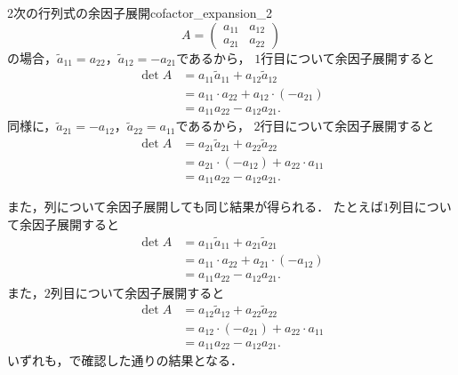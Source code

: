 \begin{example}{2次の行列式の余因子展開}{cofactor_expansion_2}
  \[
  A = \begin{pmatrix}
    a_{11} & a_{12} \\
    a_{21} & a_{22}
  \end{pmatrix}
  \]
  の場合，$\tilde{a}_{11} = a_{22}$，$\tilde{a}_{12} = -a_{21}$であるから，
  $1$行目について余因子展開すると
  \begin{align*}
    \det A
    &= a_{11}\tilde{a}_{11} + a_{12}\tilde{a}_{12} \\
    &= a_{11}\cdot a_{22} + a_{12}\cdot(-a_{21}) \\
    &= a_{11}a_{22} - a_{12}a_{21}.
  \end{align*}
  同様に，$\tilde{a}_{21} = -a_{12}$，$\tilde{a}_{22} = a_{11}$であるから，
  $2$行目について余因子展開すると
  \begin{align*}
    \det A
    &= a_{21}\tilde{a}_{21} + a_{22}\tilde{a}_{22} \\
    &= a_{21}\cdot(-a_{12}) + a_{22}\cdot a_{11} \\
    &= a_{11}a_{22} - a_{12}a_{21}.
  \end{align*}

  また，列について余因子展開しても同じ結果が得られる．
  たとえば$1$列目について余因子展開すると
  \begin{align*}
    \det A
    &= a_{11}\tilde{a}_{11} + a_{21}\tilde{a}_{21} \\
    &= a_{11}\cdot a_{22} + a_{21}\cdot(-a_{12}) \\
    &= a_{11}a_{22} - a_{12}a_{21}.
  \end{align*}
  また，$2$列目について余因子展開すると
  \begin{align*}
    \det A
    &= a_{12}\tilde{a}_{12} + a_{22}\tilde{a}_{22} \\
    &= a_{12}\cdot(-a_{21}) + a_{22}\cdot a_{11} \\
    &= a_{11}a_{22} - a_{12}a_{21}.
  \end{align*}
  いずれも，で確認した通りの結果となる．
\end{example}

